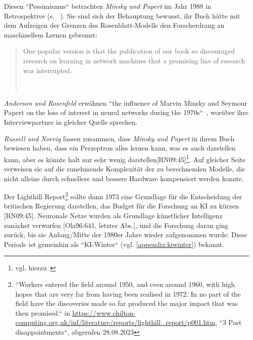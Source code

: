 \noindent
Diesen ``Pessimismus`` betrachten \textit{Minsky und Papert} im Jahr 1988 in Retrospektive (s. ~\cite[xiii]{MP88}). Sie sind sich der Behauptung bewusst, ihr Buch hätte mit dem Aufzeigen der Grenzen des Rosenblatt-Modells den Forscherdrang an maschinellem Lernen gebremst:

\blockquote[{~\cite[xii]{MP88}}]{
One popular version is  that the publication of our book so discouraged research on learning in network machines that a promising line of research was interrupted.
}

\noindent
\textit{Anderson und Rosenfeld} erwähnen ``the influence of Marvin Minsky and Seymour Papert on the loss of interest in neural networks during the 1970s``~\cite[X]{AR98}, worüber ihre Interviewpartner in gleicher Quelle sprechen.

\textit{Russell und Norvig} fassen zusammen, dass \textit{Minsky und Papert} in ihrem Buch bewiesen haben, dass ein Perzeptron alles lernen kann, was es auch darstellen kann, aber es könnte halt nur sehr wenig darstellen[RN09:45]\footnote{
    vgl. hierzu~\cite[xiii]{MP88}
}. Auf gleicher Seite verweisen sie auf die zunehmende Komplexität der zu berechnenden Modelle, die nicht alleine durch schnellere und bessere Hardware kompensiert werden konnte.

Der Lighthill Report\footnote{
    ``Workers entered the field around 1950, and even around 1960, with high hopes that are very far from having been realised in 1972. In no part of the field have the discoveries made so far produced the major impact that was then promised.`` in \url{https://www.chilton-computing.org.uk/inf/literature/reports/lighthill\_report/p001.htm}, ``3 Past disappointments``, abgerufen 28.08.2023
} sollte dann 1973 eine Grundlage für die Entscheidung der britischen Regierung darstellen, das Budget für die Forschung an KI zu kürzen [RN09:45]. Neuronale Netze wurden als Grundlage künstlicher Intelligenz zunächst verworfen [Ola96:641, letzter Abs.], und die Forschung daran ging zurück, bis sie Anfang/Mitte der 1980er Jahre wieder aufgenommen wurde: Diese Periode ist gemeinhin als ``KI-Winter`` (vgl. \ref{appendix:kiwinter}) bekannt.

